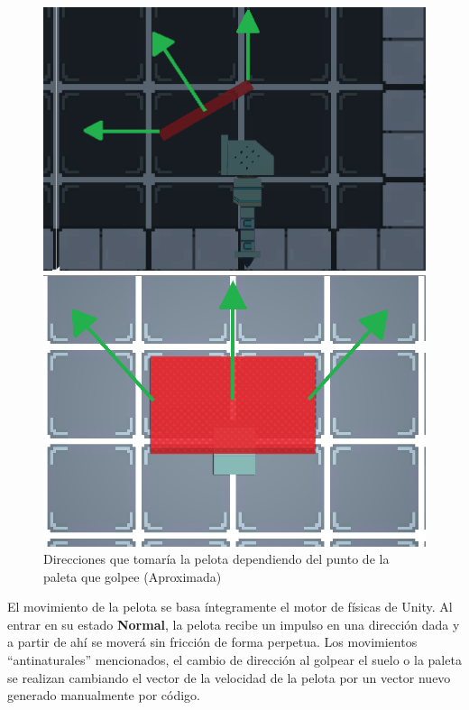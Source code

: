 \begin{figure}[!htb]
   \begin{minipage}{0.5\textwidth}
     \centering
     \includegraphics[width=0.9\linewidth, right]{images/estructura/fisica/paddle_direction_side}
   \end{minipage}\hfill
   \begin {minipage}{0.5\textwidth}
     \centering
     \includegraphics[width=0.9\linewidth, left]{images/estructura/fisica/paddle_direction_top}
   \end{minipage}
   \caption{Direcciones que tomaría la pelota dependiendo del punto de la paleta que golpee (Aproximada)}
\end{figure}
El movimiento de la pelota se basa íntegramente el motor de físicas de Unity. Al entrar en su estado \textbf{Normal}, la pelota recibe un impulso en una dirección dada y a partir de ahí se moverá sin fricción   de forma perpetua. Los movimientos ``antinaturales'' mencionados, el cambio de dirección al golpear el suelo o la paleta se realizan cambiando el vector de la velocidad de la pelota por un vector nuevo generado manualmente por código.

